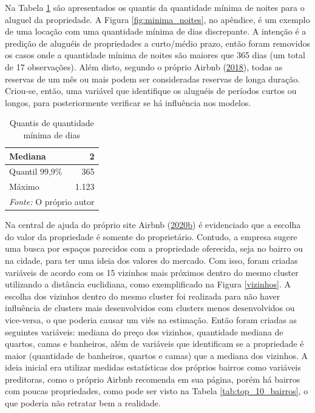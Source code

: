 \documentclass[
	12pt,				%
	a4paper,		%
	oneside,    %
	chapter=TITLE,		   %
	section=TITLE,		   %
	subsection=TITLE,	   %
	subsubsection=TITLE, %
	english,			%
	french,				%
	spanish,			%
	brazil,				%
]{abntex2}
\begin{document}
Na Tabela \ref{tab:minimum_nights} são apresentados os quantis da
quantidade mínima de noites para o aluguel da propriedade. A Figura
\ref{fig:minima_noites}, no apêndice, é um exemplo de uma locação com
uma quantidade mínima de dias discrepante. A intenção é a predição de
aluguéis de propriedades a curto/médio prazo, então foram removidos os
casos onde a quantidade mínima de noites são maiores que 365 dias (um
total de 17 observações). Além disto, segundo o próprio Airbnb
(\protect\hyperlink{ref-airbnbperiodolongo}{2018}), todas as reservas de
um mês ou mais podem ser consideradas reservas de longa duração.
Criou-se, então, uma variável que identifique os aluguéis de períodos
curtos ou longos, para posteriormente verificar se há influência nos
modelos.

\begin{table}

\caption{\label{tab:minimum_nights}Quantis de quantidade mínima de dias}
\centering
\begin{tabular}[t]{l|r}
\hline
Mediana & 2\\
\hline
Quantil 99,9\% & 365\\
\hline
Máximo & 1.123\\
\hline
\multicolumn{2}{l}{\textit{Fonte: } O próprio autor}\\
\end{tabular}
\end{table}

Na central de ajuda do próprio site Airbnb
(\protect\hyperlink{ref-precoairbnb}{2020}\protect\hyperlink{ref-precoairbnb}{b})
é evidenciado que a escolha do valor da propriedade é somente do
proprietário. Contudo, a empresa sugere uma busca por espaços parecidos
com a propriedade oferecida, seja no bairro ou na cidade, para ter uma
ideia dos valores do mercado. Com isso, foram criadas variáveis de
acordo com os 15 vizinhos mais próximos dentro do mesmo cluster
utilizando a distância euclidiana, como exemplificado na Figura
\ref{vizinhos}. A escolha dos vizinhos dentro do mesmo cluster foi
realizada para não haver influência de clusters mais desenvolvidos com
clusters menos desenvolvidos ou vice-versa, o que poderia causar um viés
na estimação. Então foram criadas as seguintes variáveis: mediana do
preço dos vizinhos, quantidade mediana de quartos, camas e banheiros,
além de variáveis que identificam se a propriedade é maior (quantidade
de banheiros, quartos e camas) que a mediana dos vizinhos. A ideia
inicial era utilizar medidas estatísticas dos próprios bairros como
variáveis preditoras, como o próprio Airbnb recomenda em sua página,
porém há bairros com poucas propriedades, como pode ser visto na Tabela
\ref{tab:top_10_bairros}, o que poderia não retratar bem a realidade.
\end{document}
